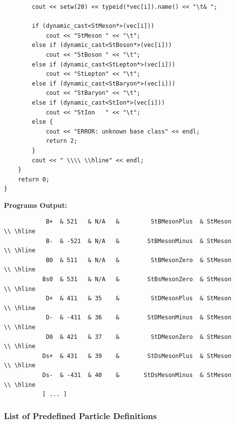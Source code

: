 \documentclass[twoside]{article}
\begin{document}
\begin{description}
{\begin{verbatim}
        cout << setw(20) << typeid(*vec[i]).name() << "\t& ";

        if (dynamic_cast<StMeson*>(vec[i]))
            cout << "StMeson " << "\t";
        else if (dynamic_cast<StBoson*>(vec[i]))
            cout << "StBoson " << "\t";
        else if (dynamic_cast<StLepton*>(vec[i]))
            cout << "StLepton" << "\t";
        else if (dynamic_cast<StBaryon*>(vec[i]))
            cout << "StBaryon" << "\t";
        else if (dynamic_cast<StIon*>(vec[i]))
            cout << "StIon   " << "\t";
        else {
            cout << "ERROR: unknown base class" << endl;
            return 2;
        }
        cout << " \\\\ \\hline" << endl;
    }    
    return 0;
}
\end{verbatim}
{\bf Programs Output:}
\begin{verbatim}
            B+  & 521   & N/A   &         StBMesonPlus  & StMeson        \\ \hline
            B-  & -521  & N/A   &        StBMesonMinus  & StMeson        \\ \hline
            B0  & 511   & N/A   &         StBMesonZero  & StMeson        \\ \hline
           Bs0  & 531   & N/A   &        StBsMesonZero  & StMeson        \\ \hline
            D+  & 411   & 35    &         StDMesonPlus  & StMeson        \\ \hline
            D-  & -411  & 36    &        StDMesonMinus  & StMeson        \\ \hline
            D0  & 421   & 37    &         StDMesonZero  & StMeson        \\ \hline
           Ds+  & 431   & 39    &        StDsMesonPlus  & StMeson        \\ \hline
           Ds-  & -431  & 40    &       StDsMesonMinus  & StMeson        \\ \hline
           [ ... ]
\end{verbatim}
}

\subsubsection{List of Predefined Particle Definitions}
\label{sec:predefpart}


\end{description}
\end{document}
